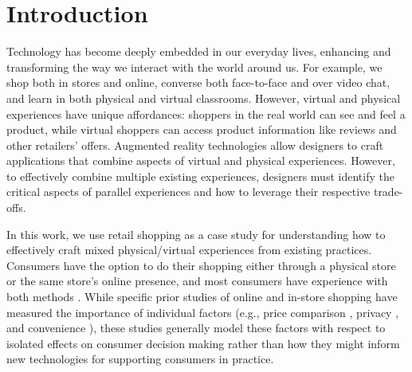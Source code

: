 \section{Introduction}

Technology has become deeply embedded in our everyday lives, enhancing and transforming the way we interact with the world around us.
For example, we shop both in stores and online, converse both face-to-face and over video chat, and learn in both physical and virtual classrooms. However, virtual and physical experiences have unique affordances: shoppers in the real world can see and feel a product, while virtual shoppers can access product information like reviews and other retailers' offers. Augmented reality technologies allow designers to craft applications that combine aspects of virtual and physical experiences. However, to effectively combine multiple existing experiences, designers must identify the critical aspects of parallel experiences and how to leverage their respective trade-offs.

In this work, we use retail shopping as a case study for understanding how to effectively craft mixed physical/virtual experiences from existing practices. Consumers have the option to do their shopping either through a physical store or the same store's online presence, and most consumers have experience with both methods \cite{nyt}. While specific prior studies of online and in-store shopping have measured the importance of individual factors (e.g., price comparison \cite{karlsson2005price}, privacy \cite{miyazaki2001consumer}, and convenience \cite{bednarz2010perceptions}), these studies generally model these factors with respect to isolated effects on consumer decision making rather than how they might inform new technologies for supporting consumers in practice. 

